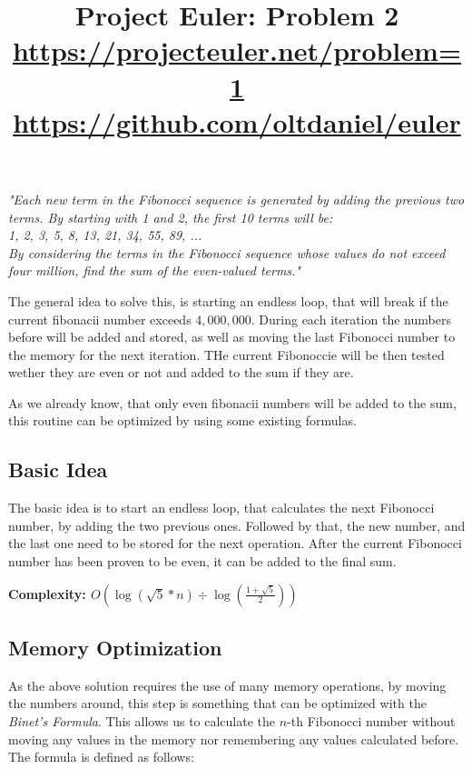 \documentclass[12pt,notitlepage]{article}
\title{Project Euler: Problem 2
\\\small{\url{https://projecteuler.net/problem=1}}\\
\small{\url{https://github.com/oltdaniel/euler}}}
\begin{document}
  \maketitle

  \begin{center}
    \textit{"Each new term in the Fibonocci sequence is generated by adding the previous two terms. By starting with 1 and 2, the first 10 terms will be:\\1, 2, 3, 5, 8, 13, 21, 34, 55, 89, ...\\By considering the terms in the Fibonocci sequence whose values do not exceed four million, find the sum of the even-valued terms."}
  \end{center}

  The general idea to solve this, is starting an endless loop, that will break if the current fibonacii number exceeds
  $4,000,000$. During each iteration the numbers before will be added and stored, as well as moving the last Fibonocci
  number to the memory for the next iteration. THe current Fibonoccie will be then tested wether they are even or not
  and added to the sum if they are.\par

  As we already know, that only even fibonacii numbers will be added to the sum, this routine can be optimized by using
  some existing formulas.

  \subsection{Basic Idea}
  The basic idea is to start an endless loop, that calculates the next Fibonocci number, by adding the two previous
  ones. Followed by that, the new number, and the last one need to be stored for the next operation. After the current
  Fibonocci number has been proven to be even, it can be added to the final sum.\par
  \textbf{Complexity: $O(\log (\sqrt{5} * n) \div \log (\frac{1 + \sqrt{5}}{2}))$}

  \subsection{Memory Optimization}
  As the above solution requires the use of many memory operations, by moving the numbers around, this step
  is something that can be optimized with the \textit{Binet's Formula}. This allows us to calculate the $n$-th
  Fibonocci number without moving any values in the memory nor remembering any values calculated before. The formula
  is defined as follows:
\end{document}
